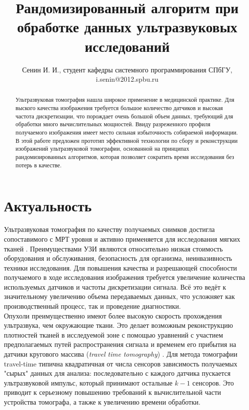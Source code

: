 \documentclass{spisok-article}
\title{Рандомизированный алгоритм при обработке данных ультразвуковых исследований
}
\author{Сенин И. И.,
  студент кафедры системного программирования СПбГУ,
  i.senin@2012.spbu.ru
}
\begin{document}
\maketitle

\begin{abstract}

Ультразвуковая томография нашла широкое применение в медицинской практике. Для выского качества изображения требуется большое количество датчиков и высокая частота дискретизации, что порождает очень большой объем данных, требующий для обработки много вычислительных мощностей. Ввиду разреженного профиля получаемого изображения имеет место сильная избыточность собираемой информации. В этой работе предложен прототип эффективной технологии по сбору и реконструкции изображений ультразвуковой томографии, основанной на принципах рандомизированных алгоритмов, которая позволяет сократить время исследования без потерь в качестве. 
\end{abstract}

\section{Актуальность}
Ультразвуковая томография по качеству получаемых снимков достигла сопоставимого с МРТ уровня и активно применяется для исследования мягких тканей \cite{hopp2014breast}.
Преимуществами УЗИ являются относительно низкая стоимость оборудования и обслуживания, безопасность для организма, неинвазивность техники исследования. Для повышения качества и разрешающей способности получаемого в ходе исследования изображения требуется увеличение количества используемых датчиков и частоты дискретизации сигнала. Всё это ведёт к значительному увеличению объема передаваемых данных, что усложняет как производственный процесс, так и проведение диагностики.\\
Опухоли преимущественно имеют более высокую скорость прохождения ультразвука, чем окружающие ткани. Это делает возможным реконструкцию плотностей тканей в исследуемой зоне с помощью уравнений с участием предполагаемых путей распространения сигнала и временем его прибытия на датчики кругового массива (\textit{travel time tomography}) \cite{quan2007sound}. Для метода томографии travel-time типична квадратичная от числа сенсоров зависимость получаемых "сырых" данных для анализа: последовательно с каждого датчика пускается ультразвуковой импульс, который принимают остальные $k-1$ сенсоров. Это приводит к серьезному повышению требований к вычислительной части устройства томографа, а также к увеличению времени обработки.
\end{document}
